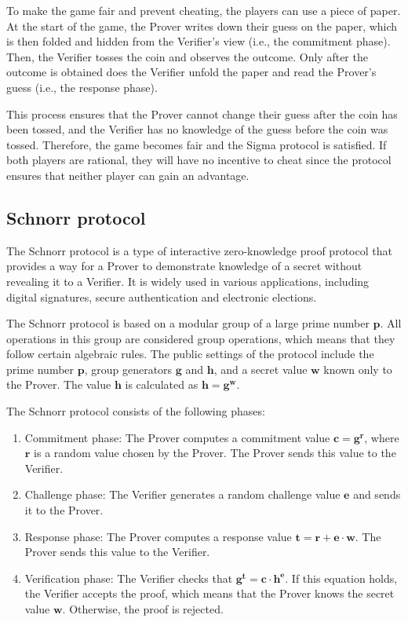 To make the game fair and prevent cheating, the players can use a piece of paper. At the start of the game, the Prover writes down their guess on the paper, which is then folded and hidden from the Verifier's view (i.e., the commitment phase). Then, the Verifier tosses the coin and observes the outcome. Only after the outcome is obtained does the Verifier unfold the paper and read the Prover's guess (i.e., the response phase).

This process ensures that the Prover cannot change their guess after the coin has been tossed, and the Verifier has no knowledge of the guess before the coin was tossed. Therefore, the game becomes fair and the Sigma protocol is satisfied. If both players are rational, they will have no incentive to cheat since the protocol ensures that neither player can gain an advantage.

\subsection{Schnorr protocol} 

The Schnorr protocol is a type of interactive zero-knowledge proof protocol that provides a way for a Prover to demonstrate knowledge of a secret without revealing it to a Verifier. It is widely used in various applications, including digital signatures, secure authentication and electronic elections.

The Schnorr protocol is based on a modular group of a large prime number $\boldsymbol{p}$. All operations in this group are considered group operations, which means that they follow certain algebraic rules. The public settings of the protocol include the prime number $\boldsymbol{p}$, group generators $\boldsymbol{g}$ and $\boldsymbol{h}$, and a secret value $\boldsymbol{w}$ known only to the Prover. The value $\boldsymbol{h}$ is calculated as $\boldsymbol{h} = \boldsymbol{g}^{\boldsymbol{w}}$.

The Schnorr protocol consists of the following phases:
\begin{enumerate}
    \item Commitment phase: The Prover computes a commitment value $\boldsymbol{c} = \boldsymbol{g}^{\boldsymbol{r}}$, where $\boldsymbol{r}$ is a random value chosen by the Prover. The Prover sends this value to the Verifier.
    \item Challenge phase: The Verifier generates a random challenge value $\boldsymbol{e}$ and sends it to the Prover.
    \item Response phase: The Prover computes a response value $\boldsymbol{t} = \boldsymbol{r} + \boldsymbol{e} \cdot \boldsymbol{w}$. The Prover sends this value to the Verifier.
    \item Verification phase: The Verifier checks that $\boldsymbol{g}^{\boldsymbol{t}} = \boldsymbol{c} \cdot \boldsymbol{h}^{\boldsymbol{e}}$. If this equation holds, the Verifier accepts the proof, which means that the Prover knows the secret value $\boldsymbol{w}$. Otherwise, the proof is rejected.
\end{enumerate}

